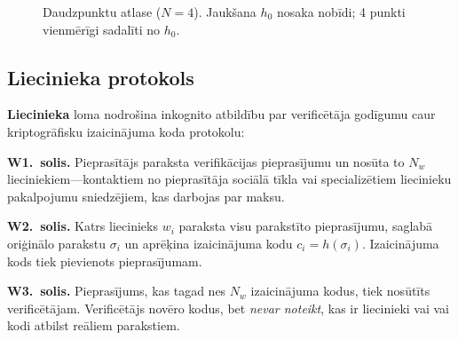 \documentclass[11pt,a4paper,twocolumn]{article}
\begin{document}
\begin{figure}[ht]
\centering
{}
\caption{Daudzpunktu atlase ($N{=}4$). Jaukšana $h_0$ nosaka nobīdi; 4 punkti vienmērīgi sadalīti no $h_0$.}
\label{fig:multipoint}
\end{figure}

\subsection{Liecinieka protokols}

\textbf{Liecinieka} loma nodrošina inkognito atbildību par verificētāja godīgumu caur kriptogrāfisku izaicinājuma koda protokolu:

\textbf{W1.\ solis.} Pieprasītājs paraksta verifikācijas pieprasījumu un nosūta to $N_w$ lieciniekiem---kontaktiem no pieprasītāja sociālā tīkla vai specializētiem liecinieku pakalpojumu sniedzējiem, kas darbojas par maksu.

\textbf{W2.\ solis.} Katrs liecinieks $w_i$ paraksta visu parakstīto pieprasījumu, saglabā oriģinālo parakstu $\sigma_i$ un aprēķina izaicinājuma kodu $c_i = h(\sigma_i)$. Izaicinājuma kods tiek pievienots pieprasījumam.

\textbf{W3.\ solis.} Pieprasījums, kas tagad nes $N_w$ izaicinājuma kodus, tiek nosūtīts verificētājam. Verificētājs novēro kodus, bet \emph{nevar noteikt}, kas ir liecinieki vai vai kodi atbilst reāliem parakstiem.
\end{document}
